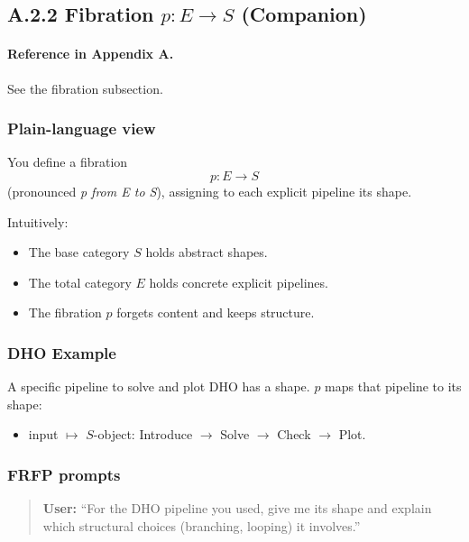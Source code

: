 \newpage

\subsection{A.2.2 Fibration $p : E \to S$ (Companion)}

\paragraph{Reference in Appendix A.}
See the fibration subsection.

\subsubsection*{Plain-language view}

You define a fibration
\[
p : E \to S
\]
(pronounced \emph{p from E to S}), assigning to each explicit pipeline its shape.

Intuitively:

\begin{itemize}
 \item The base category $S$ holds abstract shapes.
 \item The total category $E$ holds concrete explicit pipelines.
 \item The fibration $p$ forgets content and keeps structure.
\end{itemize}

\subsubsection*{DHO Example}

A specific pipeline to solve and plot DHO has a shape. 
$p$ maps that pipeline to its shape:

\begin{itemize}
 \item input $\mapsto$ $S$-object: 
 \textsf{Introduce} $\to$ \textsf{Solve} $\to$ \textsf{Check} $\to$ \textsf{Plot}.
\end{itemize}

\subsubsection*{FRFP prompts}

\begin{quote}
\textbf{User:} 
``For the DHO pipeline you used, give me its shape and explain which structural choices (branching, looping) it involves.'' 
\end{quote}

